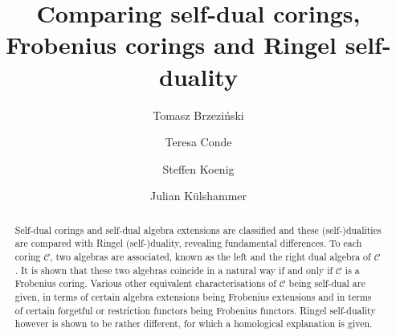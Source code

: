 \documentclass[12pt,a4paper]{amsart}
\theoremstyle{plain}
\theoremstyle{definition}
\numberwithin{equation}{thm}
\begin{document}
\title[Comparing self-dual corings, Frobenius corings and Ringel self-duality]{Comparing self-dual corings, Frobenius corings and Ringel self-duality}
\author{Tomasz Brzezi\'nski}
\author{Teresa Conde}
\author{Steffen Koenig} 
\author{Julian K\"ulshammer}

\address{Tomasz Brzezi\'nski\\
Department of Mathematics, Swansea University\\
Swansea University Bay Campus\\
Fabian Way\\
  Swansea SA1 8EN, U.K.\ \newline \indent
Faculty of Mathematics, University of Bia{\l}ystok\\ K.\ Cio{\l}kowskiego  1M\\
15-245 Bia\-{\l}ys\-tok, Poland}

\address{Teresa Conde\\
  Faculty of Mathematics and TRR 358,
  University of Bielefeld \\
  Universit\"atsstra{\ss}e 25, 33615 Bielefeld, Germany } 
  
\address{Steffen Koenig\\
Institute of Algebra and Number Theory,
University of Stuttgart \\ Pfaffenwaldring 57 \\ 70569 Stuttgart,
Germany} 

\address{Julian K\"ulshammer\\
Department of Mathematics, Uppsala University\\
Box 480 \\ 75106 Uppsala, Sweden} 



\begin{abstract}
    Self-dual corings and self-dual algebra extensions are
    classified and these (self-)dualities are compared with Ringel
    (self-)duality, revealing fundamental differences.
    To each coring $\mathcal C$, two algebras are associated, known as the left
    and the right dual algebra of $\mathcal C$.
    It is shown that these two algebras coincide in a natural way if and
    only if $\mathcal C$ is a Frobenius coring. Various other equivalent
    characterisations of $\mathcal C$ being self-dual
    are given, in terms of certain
    algebra extensions being Frobenius extensions and in terms of certain
    forgetful or restriction functors being Frobenius functors. Ringel self-duality however is shown to be rather different, for which a homological explanation is given.
    \end{abstract}
\end{document}

